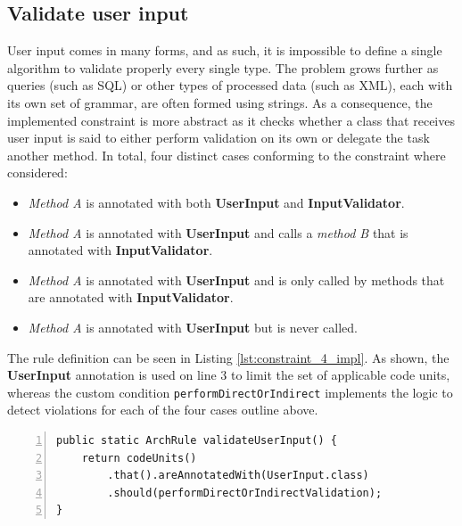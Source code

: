 

\subsection{Validate user input}
User input comes in many forms, and as such, it is impossible to define a single algorithm to validate properly every single type. The problem grows further as queries (such as SQL) or other types of processed data (such as XML), each with its own set of grammar, are often formed using strings. As a consequence, the implemented constraint is more abstract as it checks whether a class that receives user input is said to either perform validation on its own or delegate the task another method. In total, four distinct cases conforming to the constraint where considered: 

\begin{itemize}
    \item \textit{Method A} is annotated with both \textbf{UserInput} and \textbf{InputValidator}.
    
    \item \textit{Method A} is annotated with \textbf{UserInput} and calls a \textit{method B} that is annotated with \textbf{InputValidator}.
    
    \item \textit{Method A} is annotated with \textbf{UserInput} and is only called by methods that are annotated with \textbf{InputValidator}.
    
    \item \textit{Method A} is annotated with \textbf{UserInput} but is never called.
\end{itemize}

The rule definition can be seen in Listing \ref{lst:constraint_4_impl}. As shown, the \textbf{UserInput} annotation is used on line 3 to limit the set of applicable code units, whereas the custom condition \texttt{performDirectOrIndirect} implements the logic to detect violations for each of the four cases outline above.
    
\begin{minipage}{\linewidth}
\begin{lstlisting}[caption={Rule definition for constraint 4.}, captionpos=b, label=lst:constraint_4_impl, numbers=left]
public static ArchRule validateUserInput() {
    return codeUnits()
        .that().areAnnotatedWith(UserInput.class)
        .should(performDirectOrIndirectValidation);
}
\end{lstlisting}
\end{minipage}

